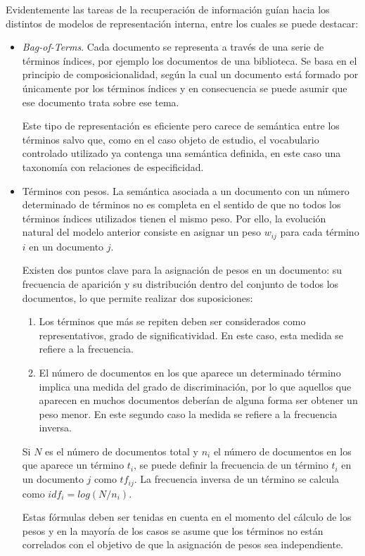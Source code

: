 Evidentemente las tareas de la recuperación de información 
guían hacia los distintos de modelos de representación interna, entre los cuales 
se puede destacar:
\begin{itemize}
 \item \textit{Bag-of-Terms}. Cada documento se representa a través 
de una serie de términos índices, por ejemplo los documentos de una 
biblioteca. Se basa en el principio de composicionalidad, según la cual 
un documento está formado por únicamente por los términos índices y en 
consecuencia se puede asumir que ese documento trata sobre ese tema. 

Este tipo de representación es eficiente pero carece de semántica entre 
los términos salvo que, como en el caso objeto de estudio, el vocabulario 
controlado utilizado ya contenga una semántica definida, en este 
caso una taxonomía con relaciones de especificidad.

\item Términos con pesos. La semántica asociada a un documento 
con un número determinado de términos no es completa en el sentido 
de que no todos los términos índices utilizados tienen el mismo peso. Por ello, 
la evolución natural del modelo anterior consiste en asignar un peso $w_{ij}$ para 
cada término $i$ en un documento $j$.

Existen dos puntos clave para la asignación de pesos en un documento: su frecuencia 
de aparición y su distribución dentro del conjunto de todos los documentos, lo que 
permite realizar dos suposiciones:
\begin{enumerate}
 \item Los términos que más se repiten deben ser considerados como representativos, 
grado de significatividad. En este caso, esta medida se refiere a la frecuencia.
 \item El número de documentos en los que aparece un determinado término implica una medida 
del grado de discriminación, por lo que aquellos que aparecen en muchos documentos 
deberían de alguna forma ser obtener un peso menor. En este segundo caso la medida 
se refiere a la frecuencia inversa.
\end{enumerate}

Si $N$ es el número de documentos total y $n_i$ el número de documentos en los que aparece 
un término $t_i$, se puede definir la frecuencia de un término $t_i$ en un documento 
$j$ como $tf_{ij}$. La frecuencia inversa de un término se calcula como $idf_{i}=log(N/n_{i})$.

Estas fórmulas deben ser tenidas en cuenta en el momento del cálculo de los pesos y en la mayoría 
de los casos se asume que los términos no están correlados con el objetivo de 
que la asignación de pesos sea independiente.

\end{itemize}

